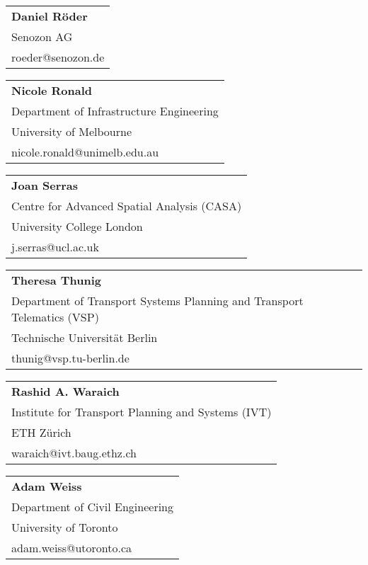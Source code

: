 \begin{tabular}[width=0.48\textwidth]{l}
\textbf{Daniel Röder} \\
Senozon AG \\
roeder@senozon.de \\
\end{tabular}

\begin{tabular}[width=0.48\textwidth]{l}
\textbf{Nicole Ronald} \\
Department of Infrastructure Engineering \\
University of Melbourne \\
nicole.ronald@unimelb.edu.au \\
\end{tabular}

\begin{tabular}[width=0.48\textwidth]{l}
\textbf{Joan Serras} \\
Centre for Advanced Spatial Analysis (CASA) \\
University College London \\
j.serras@ucl.ac.uk \\
\end{tabular}

\begin{tabular}[width=0.48\textwidth]{l}
\textbf{Theresa Thunig} \\
Department of Transport Systems Planning and Transport Telematics (VSP) \\
Technische Universität Berlin \\
thunig@vsp.tu-berlin.de \\
\end{tabular}

\begin{tabular}[width=0.48\textwidth]{l}
\textbf{Rashid A. Waraich} \\
Institute for Transport Planning and Systems (IVT) \\
ETH Zürich \\
waraich@ivt.baug.ethz.ch \\
\end{tabular}

\begin{tabular}[width=0.48\textwidth]{l}
\textbf{Adam Weiss} \\
Department of Civil Engineering \\
University of Toronto \\
adam.weiss@utoronto.ca  \\
\end{tabular}

